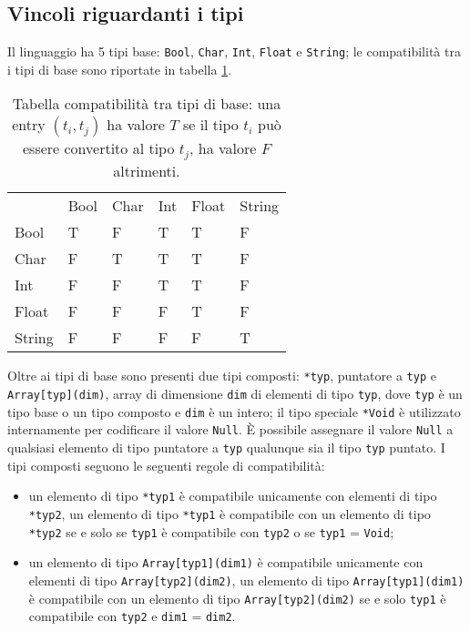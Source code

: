 \subsection*{Vincoli riguardanti i tipi}
Il linguaggio ha 5 tipi base: \texttt{Bool}, \texttt{Char}, \texttt{Int}, \texttt{Float} e \texttt{String}; le compatibilità tra i tipi di base sono riportate in tabella \ref{tab:compatibilitaTipiBase}. \\

\begin{table}[]
\begin{tabular}{llllll}
    & Bool & Char & Int & Float & String \\
Bool   & T    & F    & T   & T     & F      \\
Char   & F    & T    & T   & T     & F      \\
Int    & F    & F    & T   & T     & F      \\
Float  & F    & F    & F   & T     & F      \\
String & F    & F    & F   & F     & T     
\end{tabular}
\caption{Tabella compatibilità tra tipi di base: una entry $(t_i, t_j)$ ha valore $T$ se il tipo $t_i$ può essere convertito al tipo $t_j$, ha valore $F$ altrimenti.}
\label{tab:compatibilitaTipiBase}
\end{table}

Oltre ai tipi di base  sono presenti due tipi composti: \texttt{*typ}, puntatore a \texttt{typ} e \texttt{Array[typ](dim)}, array di dimensione \texttt{dim} di elementi di tipo \texttt{typ}, dove \texttt{typ} è un tipo base o un tipo composto e \texttt{dim} è un intero; il tipo speciale \texttt{*Void} è utilizzato internamente per codificare il valore \texttt{Null}. È possibile assegnare il valore \texttt{Null} a qualsiasi elemento di tipo puntatore a \texttt{typ} qualunque sia il tipo \texttt{typ} puntato.
I tipi composti seguono le seguenti regole di compatibilità:
\begin{itemize}
\item un elemento di tipo \texttt{*typ1} è compatibile unicamente con elementi di tipo \texttt{*typ2}, un elemento di tipo \texttt{*typ1} è compatibile con un elemento di tipo \texttt{*typ2} se e solo se \texttt{typ1} è compatibile con \texttt{typ2} o se \texttt{typ1} = \texttt{Void};
\item un elemento di tipo \texttt{Array[typ1](dim1)} è compatibile unicamente con elementi di tipo \texttt{Array[typ2](dim2)}, un elemento di tipo \texttt{Array[typ1](dim1)} è compatibile con un elemento di tipo \texttt{Array[typ2](dim2)} se e solo \texttt{typ1} è compatibile con \texttt{typ2} e \texttt{dim1} = \texttt{dim2}.
\end{itemize}

